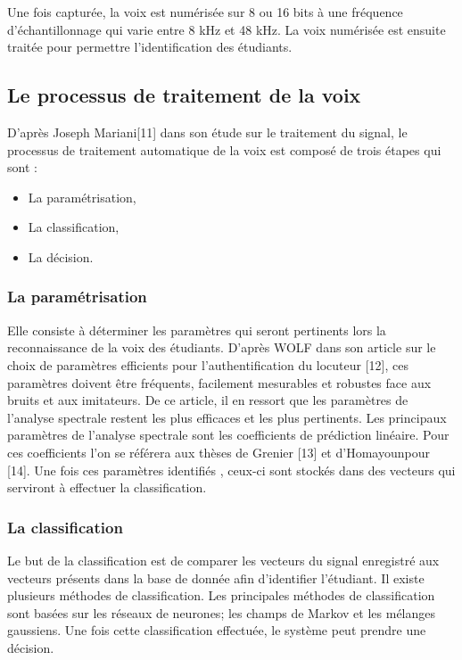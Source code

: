 \documentclass[overfullbox]{polytech/polytech}
\begin{document}
Une fois capturée, la voix est numérisée  sur 8 ou 16 bits à une fréquence d’échantillonnage qui varie entre 8 kHz et 48 kHz. La voix numérisée est ensuite traitée pour permettre l'identification des étudiants.

\subsection{Le processus de traitement de la voix}
D'après Joseph Mariani[11] dans son étude sur le traitement du signal, le processus de traitement automatique de la voix est composé de trois étapes qui sont : 
\begin{itemize}
\item La paramétrisation,
\item La classification,
\item La décision.
\end{itemize}

\subsubsection{La paramétrisation}
Elle consiste à déterminer les paramètres qui seront pertinents lors la reconnaissance de la voix des étudiants. D'après WOLF dans son article sur le choix de paramètres efficients pour l’authentification du locuteur [12], ces paramètres doivent être fréquents, facilement mesurables et robustes face aux bruits et aux imitateurs. De ce article, il en ressort que les paramètres de l'analyse spectrale restent les plus efficaces et les plus pertinents. Les principaux paramètres de l'analyse spectrale sont les coefficients de prédiction linéaire. Pour ces coefficients  l'on se référera aux thèses de Grenier  [13] et d'Homayounpour [14]. Une fois ces paramètres identifiés , ceux-ci sont stockés dans des vecteurs qui serviront à effectuer la classification. 

\subsubsection{La classification}
Le but de la classification est de comparer les vecteurs du signal enregistré aux vecteurs présents dans la base de donnée afin d'identifier l'étudiant. Il existe plusieurs méthodes de classification. Les principales méthodes de classification sont basées sur les réseaux de neurones; les champs de Markov et les mélanges gaussiens. Une fois cette classification effectuée, le système peut prendre une décision.
\end{document}
